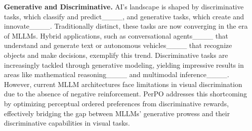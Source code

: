 \textbf{Generative and Discriminative.} AI's landscape is shaped by discriminative tasks, which classify and predict____, and generative tasks, which create and innovate____. Traditionally distinct, these tasks are now converging in the era of MLLMs. Hybrid applications, such as conversational agents____ that understand and generate text or autonomous vehicles____ that recognize objects and make decisions, exemplify this trend. Discriminative tasks are increasingly tackled through generative modeling, yielding impressive results in areas like mathematical reasoning____ and multimodal inference____. However, current MLLM architectures face limitations in visual discrimination due to the absence of negative reinforcement. PerPO addresses this shortcoming by optimizing perceptual ordered preferences from discriminative rewards, effectively bridging the gap between MLLMs' generative prowess and their discriminative capabilities in visual tasks.


\vspace{-0.5em}